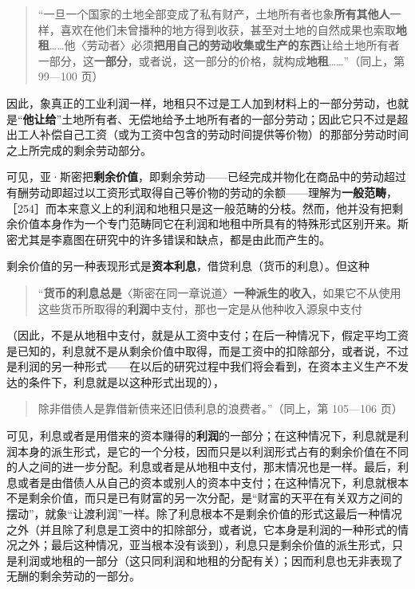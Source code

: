 \begin{quote}“一旦一个国家的土地全部变成了私有财产，土地所有者也象\textbf{所有其他人}一样，喜欢在他们未曾播种的地方得到收获，甚至对土地的自然成果也索取\textbf{地租}……他〈劳动者〉必须\textbf{把用自己的劳动收集或生产的东西}让给土地所有者一部分，这\textbf{一部分}，或者说，这一部分的价格，就构成\textbf{地租}……”（同上，第 99—100 页）\end{quote}

因此，象真正的工业利润一样，地租只不过是工人加到材料上的一部分劳动，也就是“\textbf{他让给}”土地所有者、无偿地给予土地所有者的一部分劳动；因此它只不过是超出工人补偿自己工资（或为工资中包含的劳动时间提供等价物）的那部分劳动时间之上所完成的剩余劳动部分。

可见，亚·斯密把\textbf{剩余价值}，即剩余劳动——已经完成并物化在商品中的劳动超过有酬劳动即超过以工资形式取得自己等价物的劳动的余额——理解为\textbf{一般范畴}，［254］而本来意义上的利润和地租只是这一般范畴的分枝。然而，他并没有把剩余价值本身作为一个专门范畴同它在利润和地租中所具有的特殊形式区别开来。斯密尤其是李嘉图在研究中的许多错误和缺点，都是由此而产生的。

剩余价值的另一种表现形式是\textbf{资本利息}，借贷利息（货币的利息）。但这种

\begin{quote}“\textbf{货币的利息总是}〈斯密在同一章说道〉\textbf{一种派生的收入}，如果它不从使用这些货币所取得的\textbf{利润}中支付，那也一定是从他种收入源泉中支付\end{quote}

（因此，不是从地租中支付，就是从工资中支付；在后一种情况下，假定平均工资是已知的，利息就不是从剩余价值中取得，而是工资中的扣除部分，或者说，不过是利润的另一种形式——在以后的研究过程中我们将会看到，在资本主义生产不发达的条件下，利息就是以这种形式出现的），

\begin{quote}除非借债人是靠借新债来还旧债利息的浪费者。”（同上，第 105—106 页）\end{quote}

可见，利息或者是用借来的资本赚得的\textbf{利润}的一部分；在这种情况下，利息就是利润本身的派生形式，是它的一个分枝，因而只是以利润形式占有的剩余价值在不同的人之间的进一步分配。利息或者是从地租中支付，那末情况也是一样。最后，利息或者是由借债人从自己的资本或别人的资本中支付；在这种情况下，利息就根本不是剩余价值，而只是已有财富的另一次分配，是“财富的天平在有关双方之间的摆动”，就象“让渡利润”一样。除了利息根本不是剩余价值的形式这最后一种情况之外（并且除了利息是工资中的扣除部分，或者说，它本身是利润的一种形式的情况之外；最后这种情况，亚当根本没有谈到），利息只是剩余价值的派生形式，只是利润或地租的一部分（这只同利润和地租的分配有关）；因而利息也无非表现了无酬的剩余劳动的一部分。


